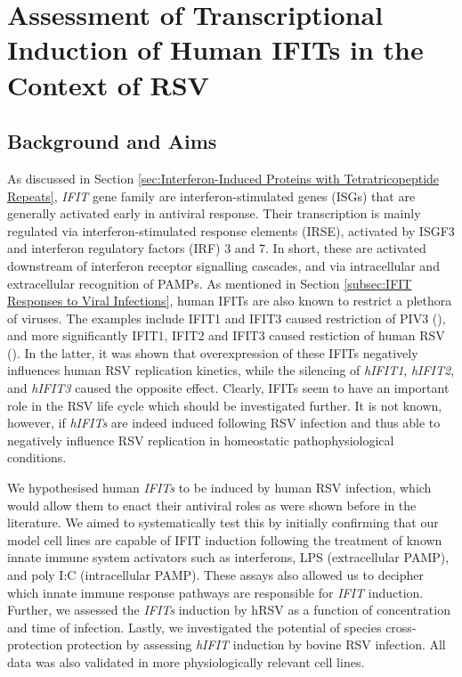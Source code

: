 \chapter{Assessment of Transcriptional Induction of Human IFITs in the Context of RSV} \label{ch:Assessment of Transcriptional Induction of Human IFITs in the Context of RSV}
\section{Background and Aims} \label{sec:Background and Aims-Chapter 1}
As discussed in Section \ref{sec:Interferon-Induced Proteins with Tetratricopeptide Repeats}, \textit{IFIT} gene family are interferon-stimulated genes (ISGs) that are generally activated early in antiviral response. Their transcription is mainly regulated via interferon-stimulated response elements (IRSE), activated by ISGF3 and interferon regulatory factors (IRF) 3 and 7. In short, these are activated downstream of interferon receptor signalling cascades, and via intracellular and extracellular recognition of PAMPs. As mentioned in Section \ref{subsec:IFIT Responses to Viral Infections}, human IFITs are also known to restrict a plethora of viruses. The examples include IFIT1 and IFIT3 caused restriction of PIV3 (\cite{Rabbani2016Identification3}), and more significantly IFIT1, IFIT2 and IFIT3 caused restiction of human RSV (\cite{Drori2020InfluenzaProteins}). In the latter, it was shown that overexpression of these IFITs negatively influences human RSV replication kinetics, while the silencing of \textit{hIFIT1}, \textit{hIFIT2}, and \textit{hIFIT3} caused the opposite effect. Clearly, IFITs seem to have an important role in the RSV life cycle which should be investigated further. It is not known, however, if \textit{hIFITs} are indeed induced following RSV infection and thus able to negatively influence RSV replication in homeostatic pathophysiological conditions.

We hypothesised human \textit{IFITs} to be induced by human RSV infection, which would allow them to enact their antiviral roles as were shown before in the literature. We aimed to systematically test this by initially confirming that our model cell lines are capable of IFIT induction following the treatment of known innate immune system activators such as interferons, LPS (extracellular PAMP), and poly I:C (intracellular PAMP). These assays also allowed us to decipher which innate immune response pathways are responsible for \textit{IFIT} induction. Further, we assessed the \textit{IFITs} induction by hRSV as a function of concentration and time of infection. Lastly, we investigated the potential of species cross-protection protection by assessing \textit{hIFIT} induction by bovine RSV infection. All data was also validated in more physiologically relevant cell lines. 

